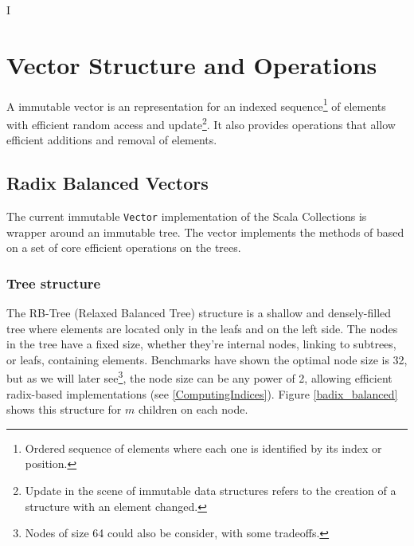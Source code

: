 I%

\chapter{Vector Structure and Operations} %

\label{VectorStructure} %



 A immutable vector is an representation for an indexed sequence\footnote{Ordered sequence of elements where each one is identified by its index or position.} of elements with efficient random access and update\footnote{Update in the scene of immutable data structures refers to the creation of a structure with an element changed.}. It also provides operations that allow efficient additions and removal of elements.
 
\section{Radix Balanced Vectors}

The current immutable \texttt{Vector} implementation\cite{scalaVector211} of the Scala Collections is wrapper around an immutable tree. The vector implements the methods of based on a set of core efficient operations on the trees.


\subsection{Tree structure}
\label{RRBTreeStructure}
The RB-Tree (Relaxed Balanced Tree)  structure is a shallow and densely-filled tree where elements are located only in the leafs and on the left side. The nodes in the tree have a fixed size, whether they're internal nodes, linking to subtrees, or leafs, containing elements. Benchmarks have shown the optimal node size is 32, but as we will later see\footnote{Nodes of size 64 could also be consider, with some tradeoffs.}, the node size can be any power of 2, allowing efficient radix-based implementations (see \ref{ComputingIndices}). Figure \ref{badix_balanced} shows this structure for $m$ children on each node. 

